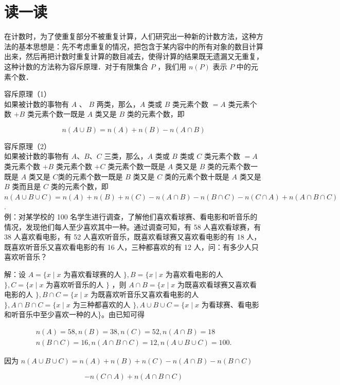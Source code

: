 \documentclass[10pt]{article}
\begin{document}
\section*{读一读}
在计数时，为了使重复部分不被重复计算，人们研究出一种新的计数方法，这种方法的基本思想是：先不考虑重复的情况，把包含于某内容中的所有对象的数目计算出来，然后再把计数时重复计算的数目减去，使得计算的结果既无遗漏又无重复，这种计数的方法称为容斥原理．对于有限集合 \(P\) ，我们用 \(n(P)\) 表示 \(P\) 中的元素个数．

容斥原理（1）\\
如果被计数的事物有 \(A\) 、 \(B\) 两类，那么，\(A\) 类或 \(B\) 类元素个数 \(=A\) 类元素个数 \(+B\) 类元素个数一既是 \(A\) 类又是 \(B\) 类的元素个数，即

\[
n(A \cup B)=n(A)+n(B)-n(A \cap B)
\]

容斥原理（2）\\
如果被计数的事物有 \(A 、 B 、 C\) 三类，那么，\(A\) 类或 \(B\) 类或 \(C\) 类元素个数 \(=A\) 类元素个数 \(+B\) 类元素个数 \(+C\) 类元素个数一既是 \(A\) 类又是 \(B\) 类的元素个数一既是 \(A\) 类又是 \(C\)类的元素个数一既是 \(B\) 类又是 \(C\) 类的元素个数十既是 \(A\) 类又是 \(B\) 类而且是 \(C\) 类的元素个数，即\\
\(n(A \cup B \cup C)=n(A)+n(B)+n(C)-n(A \cap B)-n(B \cap C)-n(C \cap A)+n(A \cap B \cap C)\).\\
例：对某学校的 100 名学生进行调查，了解他们喜欢看球赛、看电影和听音乐的情况，发现他们每人至少喜欢其中一种。通过调查可知，有 58 人喜欢看球赛，有 38 人喜欢看电影，有 52 人喜欢听音乐，既喜欢看球赛又喜欢看电影的有 18 人，既喜欢听音乐又喜欢看电影的有 16 人，三种都喜欢的有 12 人，问：有多少人只喜欢听音乐？

解：设 \(A=\{x \mid x\) 为喜欢看球赛的人 \(\}, B=\{x \mid x\) 为喜欢看电影的人 \(\}, C=\{x \mid x\) 为喜欢听音乐的人 \(\}\) ，则 \(A \cap B=\{x \mid x\) 为既喜欢看球赛又喜欢看电影的人 \(\}, B \cap C=\{x \mid x\) 为既喜欢听音乐又喜欢看电影的人 \(\}, A \cap B \cap C=\{x \mid x\) 为三种都喜欢的人 \(\}, A \cup B \cup C=\{x \mid x\) 为看球赛、看电影和听音乐中至少喜欢一种的人\}。由已知可得

\[
\begin{gathered}
n(A)=58, n(B)=38, n(C)=52, n(A \cap B)=18 \\
n(B \cap C)=16, n(A \cap B \cap C)=12, n(A \cup B \cup C)=100 .
\end{gathered}
\]

因为 \(n(A \cup B \cup C)=n(A)+n(B)+n(C)-n(A \cap B)-n(B \cap C)\)

\[
-n(C \cap A)+n(A \cap B \cap C)
\]
\end{document}

